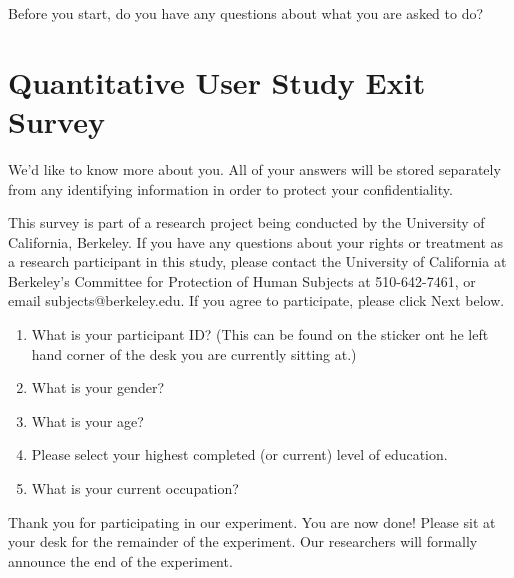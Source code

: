 \documentclass[USenglish,oneside,twocolumn]{article}
\begin{document}
Before you start, do you have any questions about what you are asked to do? 

\section{Quantitative User Study Exit Survey} 
\label{quantitative-exit-survey}
We'd like to know more about you.  All of your answers will be stored separately from any identifying information in order to protect your confidentiality.

This survey is part of a research project being conducted by the University of California, Berkeley. If you have any questions about your rights or treatment as a research participant in this study, please contact the University of California at Berkeley's Committee for Protection of Human Subjects at 510-642-7461, or email subjects@berkeley.edu. If you agree to participate, please click Next below.\\

\begin{enumerate}
\item{What is your participant ID? (This can be found on the sticker ont he left hand corner of the desk you are currently sitting at.)}
\item{What is your gender?}
\item{What is your age?}
\item{Please select your highest completed (or current) level of education}.
\item{What is your current occupation?}  
\end{enumerate}

Thank you for participating in our experiment. You are now done! Please sit at your desk for the remainder of the experiment. Our researchers will formally announce the end of the experiment. 
\end{document}
